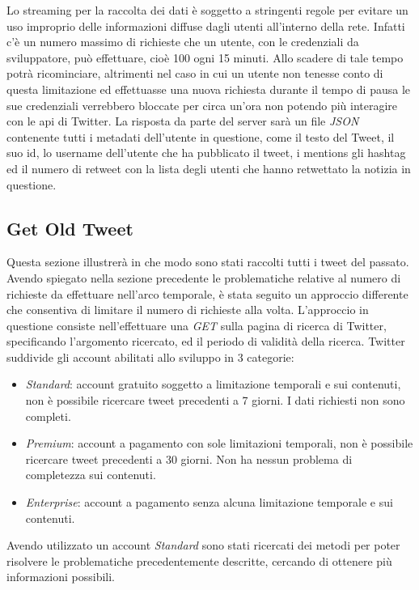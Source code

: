 Lo streaming per la raccolta dei dati è soggetto a stringenti regole per evitare un uso improprio delle informazioni diffuse dagli utenti all'interno della rete. Infatti c'è un numero massimo di richieste che un utente, con le credenziali da sviluppatore, può effettuare, cioè 100 ogni 15 minuti. Allo scadere di tale tempo potrà ricominciare, altrimenti nel caso in cui un utente non tenesse conto di questa limitazione ed effettuasse una nuova richiesta durante il tempo di pausa le sue credenziali verrebbero bloccate per circa un'ora non potendo più interagire con le api di Twitter.
La risposta da parte del server sarà un file \textit{JSON} contenente tutti i metadati dell'utente in questione, come il testo del Tweet, il suo id, lo username dell'utente che ha pubblicato il tweet, i mentions gli hashtag ed il numero di retweet con la lista degli utenti che hanno retwettato la notizia in questione.

\subsection{Get Old Tweet}

Questa sezione illustrerà in che modo sono stati raccolti tutti i tweet del passato. Avendo spiegato nella sezione precedente le problematiche relative al numero di richieste da effettuare nell'arco temporale, è stata seguito un approccio differente che consentiva di limitare il numero di richieste alla volta.
L'approccio in questione consiste nell'effettuare una \textit{GET} sulla pagina di ricerca di Twitter, specificando l'argomento ricercato, ed il periodo di validità della ricerca.
Twitter suddivide gli account abilitati allo sviluppo in 3 categorie:
\begin{itemize}
\item \textit{Standard}: account gratuito soggetto a limitazione temporali e sui contenuti, non è possibile ricercare tweet precedenti a 7 giorni. I dati richiesti non sono completi.
\item \textit{Premium}: account a pagamento con sole limitazioni temporali, non è possibile ricercare tweet precedenti a 30 giorni. Non ha nessun problema di completezza sui contenuti.
\item \textit{Enterprise}: account a pagamento senza alcuna limitazione temporale e sui contenuti.
\end{itemize}
Avendo utilizzato un account \textit{Standard} sono stati ricercati dei metodi per poter risolvere le problematiche precedentemente descritte, cercando di ottenere più informazioni possibili.

